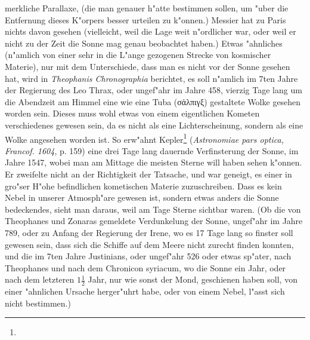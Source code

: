 \documentclass[a4paper, 11pt, oneside, polutonikogreek, german]{article}
\begin{document}
merkliche Parallaxe, (die man genauer h"atte bestimmen sollen, um "uber die Entfernung dieses K"orpers besser urteilen zu k"onnen.) Messier hat zu Paris nichts davon gesehen (vielleicht, weil die Lage weit n"ordlicher war, oder weil er nicht zu der Zeit die Sonne mag genau beobachtet haben.) Etwas "ahnliches (n"amlich von einer sehr in die L"ange gezogenen Strecke von kosmischer Materie), nur mit dem Unterschiede, dass man es nicht vor der Sonne gesehen hat, wird in \emph{Theophanis Chronographia} berichtet, es soll n"amlich im 7ten Jahre der Regierung des Leo Thrax, oder ungef"ahr im Jahre 458, vierzig Tage lang um die Abendzeit am Himmel eine wie eine Tuba (σἀλπιγξ) gestaltete Wolke gesehen worden sein. Dieses muss wohl etwas von einem eigentlichen Kometen verschiedenes gewesen sein, da es nicht als eine Lichterscheinung, sondern als eine Wolke angesehen worden ist. So erw"ahnt Kepler\footnote{} (\emph{Astronomiae pars optica, Francof. 1604}, p. 159) eine drei Tage lang dauernde Verfinsterung der Sonne, im Jahre 1547, wobei man am Mittage die meisten Sterne will haben sehen k"onnen. Er zweifelte nicht an der Richtigkeit der Tatsache, und war geneigt, es einer in gro"ser H"ohe befindlichen kometischen Materie zuzuschreiben. Dass es kein Nebel in unserer Atmosph"are gewesen ist, sondern etwas anders die Sonne bedeckendes, sieht man daraus, weil am Tage Sterne sichtbar waren. (Ob die von Theophanes und Zonaras gemeldete Verdunkelung der Sonne, ungef"ahr im Jahre 789, oder zu Anfang der Regierung der Irene, wo es 17 Tage lang so finster soll gewesen sein, dass sich die Schiffe auf dem Meere nicht zurecht finden konnten, und die im 7ten Jahre Justinians, oder ungef"ahr 526 oder etwas sp"ater, nach Theophanes und nach dem Chronicon syriacum, wo die Sonne ein Jahr, oder nach dem letzteren $\mathfrak{1\frac{1}{2}}$ Jahr, nur wie sonst der Mond, geschienen haben soll, von einer "ahnlichen Ursache herger"uhrt habe, oder von einem Nebel, l"asst sich nicht bestimmen.) 
\end{document}
